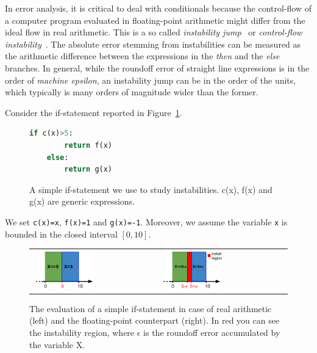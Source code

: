In error analysis, it is critical to deal with conditionals because the control-flow of a computer program evaluated in floating-point arithmetic might differ from the ideal flow in real arithmetic.
%
%
This is a so called \emph{instability jump}~\cite{satire} or \emph{control-flow instability}~\cite{unstable}.
%
The absolute error stemming from instabilities can be measured as the arithmetic difference between the expressions in the \emph{then} and the \emph{else} branches.
%
In general, while the roundoff error of straight line expressions is in the order of \emph{machine epsilon}, an instability jump can be in the order of the units, which typically is many orders of magnitude wider than the former.
%

Consider the if-statement reported in Figure~\ref{fig:ifstatement}. 
%
\begin{figure}[h!]
	\begin{lstlisting}[frame=single, language=Python]
	if c(x)>5:
		return f(x)
	else:
		return g(x)	
	\end{lstlisting}
	\caption{A simple if-statement we use to study instabilities. c(x), f(x) and g(x) are generic expressions.}\label{fig:ifstatement}
\end{figure}
%

We set \lstinline{c(x)=x}, \lstinline{f(x)=1} and \lstinline{g(x)=-1}.
%
Moreover, we assume the variable \lstinline{x} is bounded in the closed interval $[0,10]$.

\begin{figure}[h!]
	\centering
	\begin{tabular}{ll}
		\includegraphics[width=0.5\textwidth]{pic/ifreal.png}
		&
		\includegraphics[width=0.5\textwidth]{pic/iffp.png}
	\end{tabular}
	\caption{The evaluation of a simple if-statement in case of real arithmetic (left) and the floating-point counterpart (right). In red you can see the instability region, where $\epsilon$ is the roundoff error accumulated by the variable X.}
	\label{fig:ifreal}
\end{figure}

